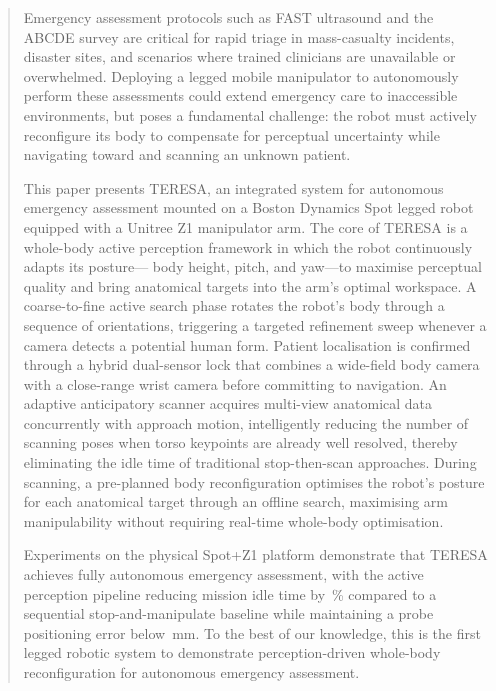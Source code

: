 \begin{abstract}

Emergency assessment protocols such as \ac{FAST} ultrasound and the \ac{ABCDE}
survey are critical for rapid triage in mass-casualty incidents, disaster
sites, and scenarios where trained clinicians are unavailable or overwhelmed.
Deploying a legged mobile manipulator to autonomously perform these assessments
could extend emergency care to inaccessible environments, but poses a
fundamental challenge: the robot must actively reconfigure its body to
compensate for perceptual uncertainty while navigating toward and scanning an
unknown patient.

This paper presents \ac{TERESA}, an integrated system for autonomous emergency
assessment mounted on a Boston Dynamics Spot legged robot equipped with a
Unitree Z1 manipulator arm. The core of \ac{TERESA} is a whole-body active
perception framework in which the robot continuously adapts its posture---
body height, pitch, and yaw---to maximise perceptual quality and bring
anatomical targets into the arm's optimal workspace. A coarse-to-fine active
search phase rotates the robot's body through a sequence of orientations,
triggering a targeted refinement sweep whenever a camera detects a potential
human form. Patient localisation is confirmed through a hybrid dual-sensor
lock that combines a wide-field body camera with a close-range wrist camera
before committing to navigation. An adaptive anticipatory scanner acquires
multi-view anatomical data concurrently with approach motion, intelligently
reducing the number of scanning poses when torso keypoints are already well
resolved, thereby eliminating the idle time of traditional stop-then-scan
approaches. During scanning, a pre-planned body reconfiguration optimises the
robot's posture for each anatomical target through an offline search,
maximising arm manipulability without requiring real-time whole-body
optimisation.

Experiments on the physical Spot+Z1 platform demonstrate that \ac{TERESA}
achieves fully autonomous emergency assessment, with the active perception
pipeline reducing mission idle time by \XX\,\% compared to a sequential
stop-and-manipulate baseline while maintaining a probe positioning error
below \XX\,mm. To the best of our knowledge, this is the first legged robotic
system to demonstrate perception-driven whole-body reconfiguration for
autonomous emergency assessment.

\end{abstract}
